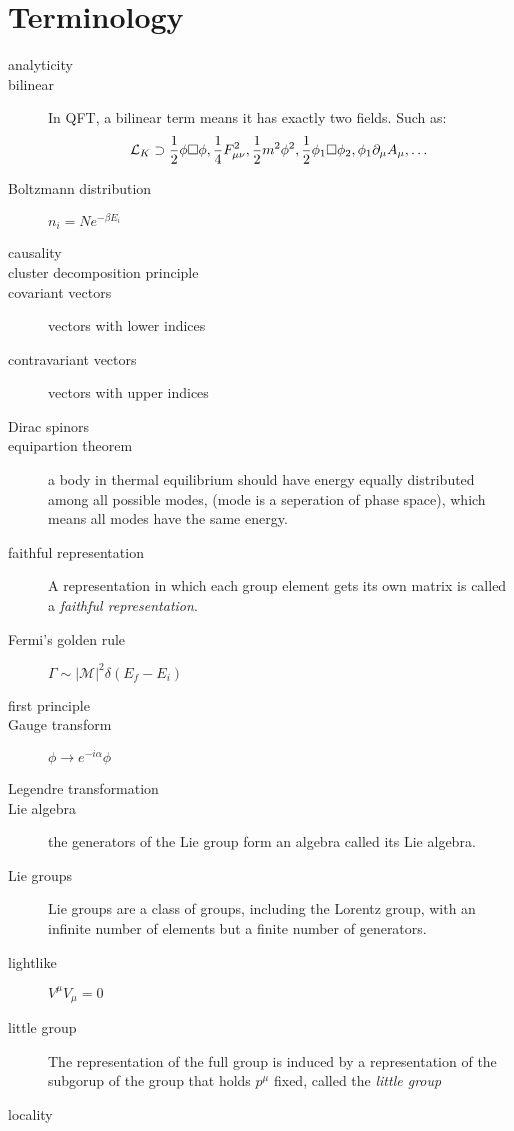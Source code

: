 \chapter{Terminology}
\begin{description}
    \item [analyticity]
    \item [bilinear]	In QFT, a bilinear term means it has exactly two
	fields. Such as:
	\[ \mathcal{L}_K \supset \frac{1}{2}\phi\Box\phi,
	\frac{1}{4}F^2_{\mu\nu}, \frac{1}{2}m^2\phi^2,
	\frac{1}{2}\phi_1\Box\phi_2, \phi_1\partial_\mu A_\mu, \dots \]
    \item [Boltzmann distribution]  $n_{i} = Ne^{-\beta E_{i}}$
    \item [causality]
    \item [cluster decomposition principle]
    \item [covariant vectors]	vectors with lower indices
    \item [contravariant vectors]   vectors with upper indices
    \item [Dirac spinors]
    \item [equipartion theorem] a body in thermal equilibrium should have
	energy equally distributed among all possible modes, (mode is a
	seperation of phase space), which means all modes have the same
	energy.
    \item [faithful representation] A representation in which each group
	element gets its own matrix is called a \emph{faithful
	representation}.
    \item [Fermi's golden rule]	$\Gamma \sim |\mathcal{M}|^{2}\delta(E_f - E_i)$
    \item [first principle]
    \item [Gauge transform] $\phi \rightarrow e^{-i\alpha}\phi$
    \item [Legendre transformation]
    \item [Lie algebra] the generators of the Lie group form an algebra
	called its Lie algebra. 
    \item [Lie groups]	Lie groups are a class of groups, including the
	Lorentz group, with an infinite number of elements but a finite
	number of generators.
    \item [lightlike]	$V^\mu V_\mu = 0$
    \item [little group] The representation of the full \Poincare{}
	group is induced by a representation of the subgorup of the
	\Poincare{} group that holds $p^\mu$ fixed, called the
	\emph{little group}
    \item [locality]

\end{description}
